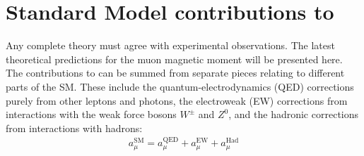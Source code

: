 \section{Standard Model contributions to \amu}
\label{sec:Theory}

Any complete theory must agree with experimental observations. The latest theoretical predictions for the muon magnetic moment will be presented here. The contributions to \amu can be summed from separate pieces relating to different parts of the SM. These include the quantum-electrodynamics (QED) corrections purely from other leptons and photons, the electroweak (EW) corrections from interactions with the weak force bosons $W^{\pm}$ and $Z^{0}$, and the hadronic corrections from interactions with hadrons: 
		\begin{align}
            a_{\mu}^{\text{SM}} = a_{\mu}^{\text{QED}} + a_{\mu}^{\text{EW}} + a_{\mu}^{\text{Had}}
		\end{align}



